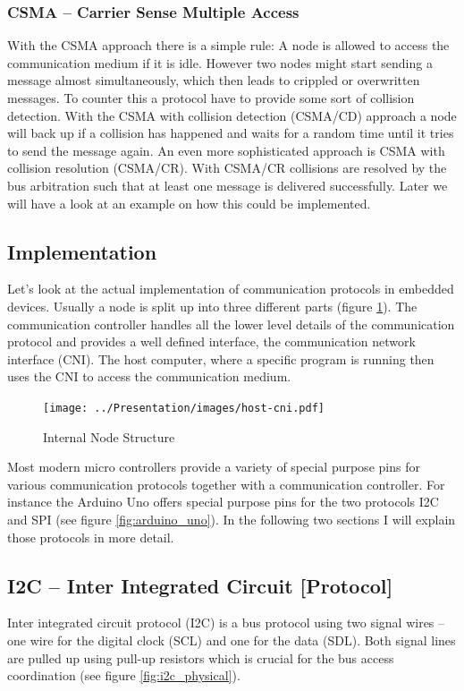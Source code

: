 \documentclass[pdftex,12pt,a4paper,fleqn]{scrartcl}
\begin{document}
\subsubsection{CSMA -- Carrier Sense Multiple Access}
With the CSMA approach there is a simple rule: A node is allowed to access the communication medium if it is idle. However two nodes might start sending a message almost simultaneously, which then leads to crippled or overwritten messages. To counter this a protocol have to provide some sort of collision detection. With the CSMA with collision detection (CSMA/CD) approach a node will back up if a collision has happened and waits for a random time until it tries to send the message again. An even more sophisticated approach is CSMA with collision resolution (CSMA/CR). With CSMA/CR collisions are resolved by the bus arbitration such that at least one message is delivered successfully. Later we will have a look at an example on how this could be implemented.

\subsection{Implementation}
Let's look at the actual implementation of communication protocols in embedded devices. Usually a node is split up into three different parts (figure \ref{fig:node_structure}). The communication controller handles all the lower level details of the communication protocol and provides a well defined interface, the communication network interface (CNI). The host computer, where a specific program is running then uses the CNI to access the communication medium.

\begin{figure}[h]	
	\centering
  \texttt{[image: ../Presentation/images/host-cni.pdf]}
  \caption{Internal Node Structure}
  \label{fig:node_structure}
\end{figure}

Most modern micro controllers provide a variety of special purpose pins for various communication protocols together with a communication controller. For instance the Arduino Uno offers special purpose pins for the two protocols I2C and SPI (see figure \ref{fig:arduino_uno}). In the following two sections I will explain those protocols in more detail.

\subsection{I2C -- Inter Integrated Circuit [Protocol]}
Inter integrated circuit protocol (I2C) is a bus protocol using two signal wires – one wire for the digital clock (SCL) and one for the data (SDL). Both signal lines are pulled up using pull-up resistors which is crucial for the bus access coordination (see figure \ref{fig:i2c_physical}). 
\end{document}
